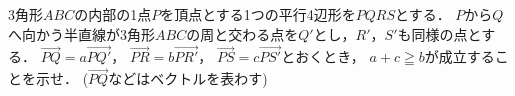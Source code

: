 \documentclass[../../main.tex]{subfiles}
\begin{document}
3角形$ABC$の内部の1点$P$を頂点とする1つの平行4辺形を$PQRS$とする．
$P$から$Q$へ向かう半直線が3角形$ABC$の周と交わる点を$Q'$とし，$R'$，$S'$も同様の点とする．
$\overrightarrow{PQ}=a\overrightarrow{PQ'}$，
$\overrightarrow{PR}=b\overrightarrow{PR'}$，
$\overrightarrow{PS}=c\overrightarrow{PS'}$とおくとき，
$a+c \geqq b$が成立することを示せ．
($\overrightarrow{PQ}$などはベクトルを表わす)
\end{document}
